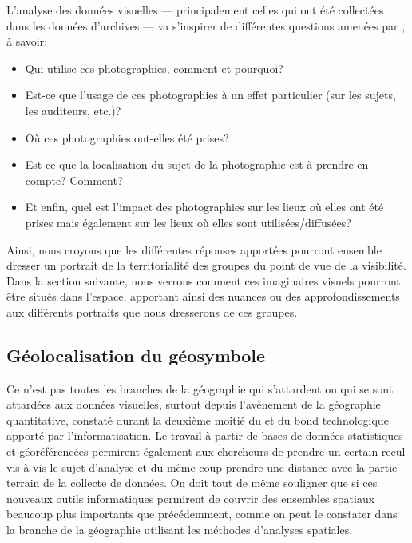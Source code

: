 

L'analyse des données visuelles --- principalement celles qui ont été collectées dans les données d'archives --- va s'inspirer de différentes questions amenées par \citet[157]{Rose2008}, à savoir:
\begin{itemize}
	\item Qui utilise ces photographies, comment et pourquoi?
	\item Est-ce que l'usage de ces photographies à un effet particulier (sur les
    sujets, les auditeurs, etc.)?
	\item Où ces photographies ont-elles été prises?
	\item Est-ce que la localisation du sujet de la photographie est à prendre en
    compte? Comment?
	\item Et enfin, quel est l'impact des photographies sur les lieux où elles ont
    été prises mais également sur les lieux où elles sont utilisées/diffusées?
\end{itemize}

Ainsi, nous croyons que les différentes réponses apportées pourront ensemble dresser un portrait de la territorialité des groupes \lgbt{} du point de vue de la visibilité. 
Dans la section suivante, nous verrons comment ces imaginaires visuels pourront être situés dans l'espace, apportant ainsi des nuances ou des approfondissements aux différents portraits que nous dresserons de ces groupes.

\subsection{Géolocalisation du géosymbole}
\label{sub:g_olocalisation_du_sybole}
Ce n'est pas toutes les branches de la géographie qui s'attardent ou qui se sont attardées aux données visuelles, surtout depuis l'avènement de la géographie quantitative, constaté durant la deuxième moitié du  et du bond technologique apporté par l'informatisation. 
Le travail à partir de bases de données statistiques et géoréférencées permirent également aux chercheurs de prendre un certain recul vis-à-vis le sujet d'analyse et du même coup prendre une distance avec la partie terrain de la collecte de données. 
On doit tout de même souligner que si ces nouveaux outils informatiques permirent de couvrir des ensembles spatiaux beaucoup plus importants que précédemment, comme on peut le constater dans la branche de la géographie utilisant les méthodes d'analyses spatiales.

